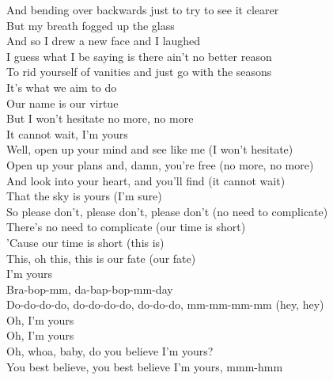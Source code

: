 \documentclass[]{article} %
\begin{document}
And bending over backwards just to try to see it clearer\\
But my breath fogged up the glass\\
And so I drew a new face and I laughed\\
I guess what I be saying is there ain't no better reason\\
To rid yourself of vanities and just go with the seasons\\
It's what we aim to do\\
Our name is our virtue\\
But I won't hesitate no more, no more\\
It cannot wait, I'm yours\\
Well, open up your mind and see like me (I won't hesitate)\\
Open up your plans and, damn, you're free (no more, no more)\\
And look into your heart, and you'll find (it cannot wait)\\
That the sky is yours (I'm sure)\\
So please don't, please don't, please don't (no need to complicate)\\
There's no need to complicate (our time is short)\\
'Cause our time is short (this is)\\
This, oh this, this is our fate (our fate)\\
I'm yours\\
Bra-bop-mm, da-bap-bop-mm-day\\
Do-do-do-do, do-do-do-do, do-do-do, mm-mm-mm-mm (hey, hey)\\
Oh, I'm yours\\
Oh, I'm yours\\
Oh, whoa, baby, do you believe I'm yours?\\
You best believe, you best believe I'm yours, mmm-hmm\\

\newpage
\end{document}
